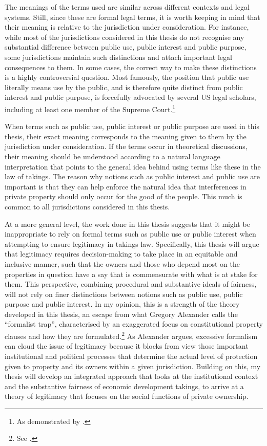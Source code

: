The meanings of the terms used are similar across different contexts and legal systems. Still, since these are formal legal terms, it is worth keeping in mind that their meaning is relative to the jurisdiction under consideration. For instance, while most of the jurisdictions considered in this thesis do not recognise any substantial difference between public use, public interest and public purpose, some jurisdictions maintain such distinctions and attach important legal consequences to them. In some cases, the correct way to make these distinctions is a highly controversial question. Most famously, the position that public use literally means use by the public, and is therefore quite distinct from public interest and public purpose, is forcefully advocated by several US legal scholars, including at least one member of the Supreme Court.\footnote{As demonstrated by \cite{kelo05}.}

When terms such as public use, public interest or public purpose are used in this thesis, their exact meaning corresponds to the meaning given to them by the jurisdiction under consideration. If the terms occur in theoretical discussions, their meaning should be understood according to a natural language interpretation that points to the general idea behind using terms like these in the law of takings. The reason why notions such as public interest and public use are important is that they can help enforce the natural idea that interferences in private property should only occur for the good of the people. This much is common to all jurisdictions considered in this thesis. %

At a more general level, the work done in this thesis suggests that it might be inappropriate to rely on formal terms such as public use or public interest when attempting to ensure legitimacy in takings law. Specifically, this thesis will argue that legitimacy requires decision-making to take place in an equitable and inclusive manner, such that the owners and those who depend most on the properties in question have a say that is commensurate with what is at stake for them. This perspective, combining procedural and substantive ideals of fairness, will not rely on finer distinctions between notions such as public use, public purpose and public interest. In my opinion, this is a strength of the theory developed in this thesis, an escape from what Gregory Alexander calls the ``formalist trap'', characterised by an exaggerated focus on constitutional property clauses and how they are formulated.\footnote{See \cite[Chapter 1]{alexander06}.} As Alexander argues, excessive formalism can cloud the issue of legitimacy because it blocks from view those important institutional and political processes that determine the actual level of protection given to property and its owners within a given jurisdiction. Building on this, my thesis will develop an integrated approach that looks at the institutional context and the substantive fairness of economic development takings, to arrive at a theory of legitimacy that focuses on the social functions of private ownership.

